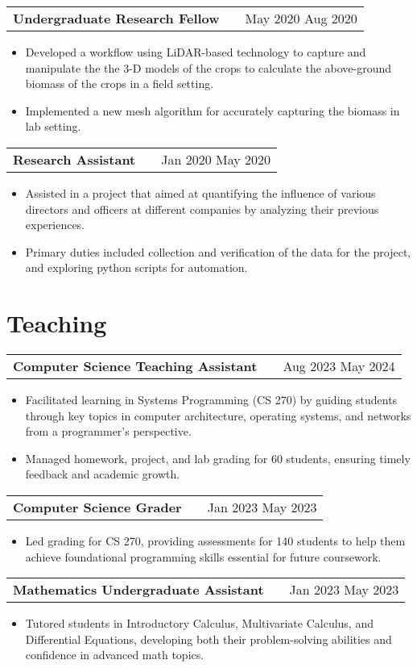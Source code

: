 \documentclass[a4paper,12pt]{article}
\makeatletter
\newenvironment{joblong}[2]
    {
    \begin{tabularx}{\linewidth}{@{}l X r@{}}
    \textbf{#1} & \hfill &  #2 \\[3.75pt]
    \end{tabularx}
    \begin{minipage}[t]{\linewidth}
    \begin{itemize}[nosep,after=\strut, leftmargin=1em, itemsep=3pt,label=--]
    }
    {
    \end{itemize}
    \end{minipage}    
    }
\makeatother
\begin{document}
\begin{joblong}{Undergraduate Research Fellow}{May 2020 Aug 2020} %
\item Developed a workflow using LiDAR-based technology to capture and manipulate the the 3-D models of the crops to calculate the above-ground biomass of the crops in a field setting. %
\item Implemented a new mesh algorithm for accurately capturing the biomass in lab setting. %
\end{joblong}
  
\begin{joblong}{Research Assistant}{Jan 2020 May 2020} %
\item Assisted in a project that aimed at quantifying the influence of various directors and officers at different companies by analyzing their previous experiences. %
\item Primary duties included collection and verification of the data for the project, and exploring python scripts for automation. %
\end{joblong}


\section{Teaching}

\begin{joblong}{Computer Science Teaching Assistant}{Aug 2023 May 2024} %
\item Facilitated learning in Systems Programming (CS 270) by guiding students through key topics in computer architecture, operating systems, and networks from a programmer's perspective. %
\item Managed homework, project, and lab grading for 60 students, ensuring timely feedback and academic growth. %
\end{joblong}

\begin{joblong}{Computer Science Grader}{Jan 2023 May 2023} %
\item Led grading for CS 270, providing assessments for 140 students to help them achieve foundational programming skills essential for future coursework. %
\end{joblong}

\begin{joblong}{Mathematics Undergraduate Assistant}{Jan 2023 May 2023} %
\item Tutored students in Introductory Calculus, Multivariate Calculus, and Differential Equations, developing both their problem-solving abilities and confidence in advanced math topics. %
\end{joblong}
\end{document}
